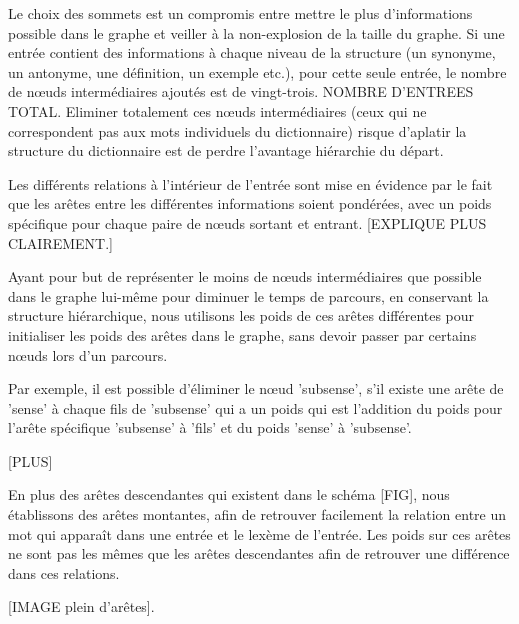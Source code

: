 \documentclass{article}
\begin{document}
Le choix des sommets est un compromis entre mettre le plus d'informations possible dans le graphe et veiller à la non-explosion de la taille du graphe. Si une entrée contient des informations à chaque  niveau de la structure (un synonyme, un antonyme, une définition, un exemple etc.), pour cette seule entrée, le nombre de nœuds intermédiaires ajoutés est de vingt-trois. NOMBRE D'ENTREES  TOTAL. Eliminer totalement ces nœuds intermédiaires (ceux qui ne correspondent pas aux mots individuels du dictionnaire) risque d'aplatir la structure du dictionnaire est de perdre l'avantage hiérarchie du départ.

Les différents relations à l'intérieur de l'entrée sont mise en évidence par le fait que les arêtes entre les différentes informations soient pondérées, avec un poids spécifique pour chaque paire de nœuds sortant et entrant. [EXPLIQUE PLUS CLAIREMENT.]

Ayant pour but de représenter le moins de nœuds intermédiaires que possible dans le graphe lui-même pour diminuer le temps de parcours, en conservant la structure hiérarchique, nous utilisons les poids de ces arêtes différentes pour initialiser les poids des arêtes dans le graphe, sans devoir passer par certains nœuds lors d'un parcours.

Par exemple, il est possible d'éliminer le nœud 'subsense', s'il existe une arête de 'sense' à chaque fils de 'subsense' qui a un poids qui est l'addition du poids pour l'arête spécifique 'subsense' à 'fils' et du poids 'sense' à 'subsense'.

[PLUS]

En plus des arêtes descendantes qui existent dans le schéma [FIG], nous établissons des arêtes montantes, afin de retrouver facilement la relation entre un mot qui apparaît dans une entrée et le lexème de l'entrée. Les poids sur ces arêtes ne sont pas les mêmes que les arêtes descendantes afin de retrouver une différence dans ces relations.

[IMAGE plein d'arêtes].
\end{document}
